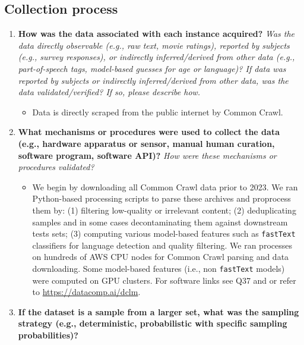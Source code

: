 \documentclass{article}
\newcommand{\ourcode}{\url{https://datacomp.ai/dclm}\xspace}  %
\newcommand{\fasttext}{\texttt{fastText}\xspace}
\newcommand{\commoncrawl}{Common Crawl\xspace}
\begin{document}
\subsection{Collection process}
\label{datasheet:collection}

\begin{enumerate}[label=Q\arabic*, resume]

\item \textbf{How was the data associated with each instance acquired?} \textit{Was the data directly observable (e.g., raw text, movie ratings), reported by subjects (e.g., survey responses), or indirectly inferred/derived from other data (e.g., part-of-speech tags, model-based guesses for age or language)? If data was reported by subjects or indirectly inferred/derived from other data, was the data validated/verified? If so, please describe how.}

\begin{itemize}
\item Data is directly scraped from the public internet by \commoncrawl.
\end{itemize}

\item \textbf{What mechanisms or procedures were used to collect the data (e.g., hardware apparatus or sensor, manual human curation, software program, software API)?} \textit{How were these mechanisms or procedures validated?}

\begin{itemize}
\item We begin by downloading all \commoncrawl data prior to 2023. We ran Python-based processing scripts to parse these archives and proprocess them by: (1) filtering low-quality or irrelevant content; (2) deduplicating samples and in some cases decontaminating them against downstream tests sets; (3) computing various model-based features such as \fasttext classifiers for language detection and quality filtering.
We ran processes on hundreds of AWS CPU nodes for \commoncrawl parsing and data downloading.
Some model-based features (i.e., non \fasttext models) were computed on GPU clusters. For software links see Q37 and  or refer to \ourcode.
\end{itemize}

\item \textbf{If the dataset is a sample from a larger set, what was the sampling strategy (e.g., deterministic, probabilistic with specific sampling probabilities)?}



\end{enumerate}
\end{document}
